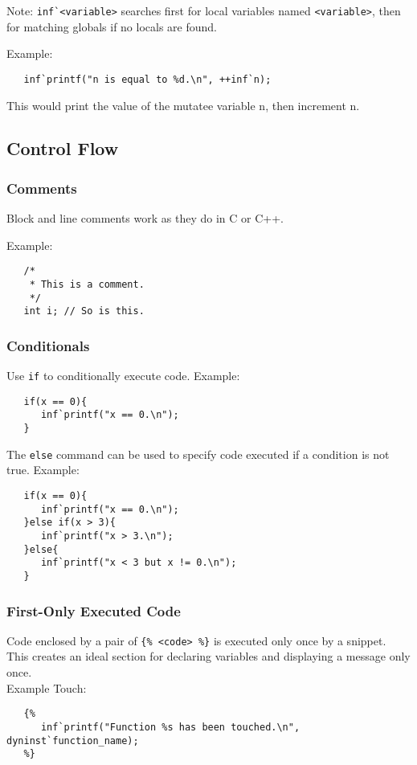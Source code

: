 \documentclass{article}
\begin{document}
Note: \verb!inf`<variable>! searches first for local variables named \verb!<variable>!, then for matching globals if no locals are found. 




\noindent Example:
\begin{lstlisting}
   inf`printf("n is equal to %d.\n", ++inf`n);
\end{lstlisting}
This would print the value of the mutatee variable n, then increment n.



\subsection{Control Flow}

\subsubsection{Comments}
Block and line comments work as they do in C or C++.

\noindent Example:
\begin{lstlisting}
   /*
    * This is a comment.
    */
   int i; // So is this.
\end{lstlisting}

\subsubsection{Conditionals}
Use \verb!if! to conditionally execute code. 
\noindent Example:
\begin{lstlisting}
   if(x == 0){
      inf`printf("x == 0.\n");
   }
\end{lstlisting}
The \verb!else! command can be used to specify code executed if a condition is not true.
\noindent Example:
\begin{lstlisting}
   if(x == 0){
      inf`printf("x == 0.\n");
   }else if(x > 3){
      inf`printf("x > 3.\n");
   }else{
      inf`printf("x < 3 but x != 0.\n");
   }
\end{lstlisting}

\subsubsection{First-Only Executed Code}
\label{sec:firstOnly}
Code enclosed by a pair of \verb!{% <code> %}! is executed only once by a snippet. This creates an ideal section for declaring variables and displaying a message only once.\\
\noindent Example Touch:
\begin{lstlisting}
   {%
      inf`printf("Function %s has been touched.\n", dyninst`function_name);
   %}
\end{lstlisting}
\end{document}
